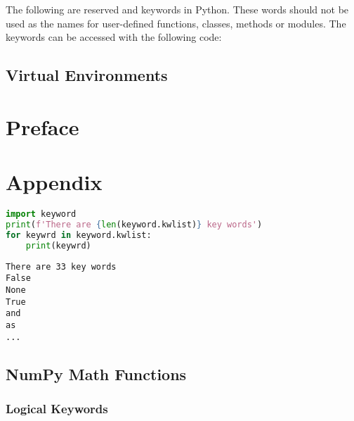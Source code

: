 
    
        The following are reserved and keywords in Python. These words should
not be used as the names for user-defined functions, classes, methods or
modules. The keywords can be accessed with the following code:
    


        \section{Virtual Environments}\label{virtual-environments}
    
\chapter*{Preface}\label{preface}
                    
                  
\chapter*{Appendix}\label{appendix} 

    
        \begin{lstlisting}[language=Python]
import keyword
print(f'There are {len(keyword.kwlist)} key words')
for keywrd in keyword.kwlist:
    print(keywrd)
\end{lstlisting}

\begin{lstlisting}
There are 33 key words
False
None
True
and
as
...
\end{lstlisting}
    
    \section{NumPy Math Functions}\label{numpy-math-functions}



    
        \subsection{Logical Keywords}\label{logical-keywords}
    


